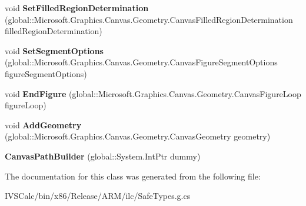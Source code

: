 \begin{DoxyCompactItemize}
void {\bfseries Set\+Filled\+Region\+Determination} (global\+::\+Microsoft.\+Graphics.\+Canvas.\+Geometry.\+Canvas\+Filled\+Region\+Determination filled\+Region\+Determination)
\item 
\mbox{\label{class_microsoft_1_1_graphics_1_1_canvas_1_1_geometry_1_1_canvas_path_builder_a39666b72c541b2b7bf5ce95ef802b83f}} 
void {\bfseries Set\+Segment\+Options} (global\+::\+Microsoft.\+Graphics.\+Canvas.\+Geometry.\+Canvas\+Figure\+Segment\+Options figure\+Segment\+Options)
\item 
\mbox{\label{class_microsoft_1_1_graphics_1_1_canvas_1_1_geometry_1_1_canvas_path_builder_ae0a5d2f680c829d0627fd7361a291e5b}} 
void {\bfseries End\+Figure} (global\+::\+Microsoft.\+Graphics.\+Canvas.\+Geometry.\+Canvas\+Figure\+Loop figure\+Loop)
\item 
\mbox{\label{class_microsoft_1_1_graphics_1_1_canvas_1_1_geometry_1_1_canvas_path_builder_acb9326bae9395128543ba0a35a264122}} 
void {\bfseries Add\+Geometry} (global\+::\+Microsoft.\+Graphics.\+Canvas.\+Geometry.\+Canvas\+Geometry geometry)
\item 
\mbox{\label{class_microsoft_1_1_graphics_1_1_canvas_1_1_geometry_1_1_canvas_path_builder_a935c167a036e0d8d48a396c57ec7fa62}} 
{\bfseries Canvas\+Path\+Builder} (global\+::\+System.\+Int\+Ptr dummy)
\end{DoxyCompactItemize}


The documentation for this class was generated from the following file\+:\begin{DoxyCompactItemize}
\item 
I\+V\+S\+Calc/bin/x86/\+Release/\+A\+R\+M/ilc/Safe\+Types.\+g.\+cs\end{DoxyCompactItemize}
